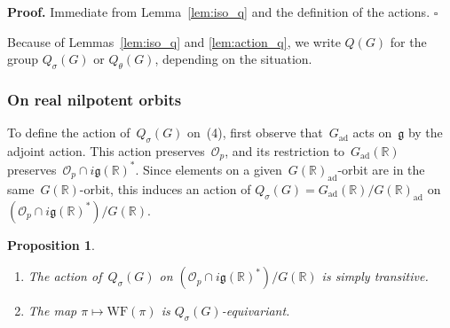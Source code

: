 \documentclass[10pt,leqno]{article}
\newtheorem{proposition}[equation]{Proposition}
\newcommand{\qed}{\hfill $\square$ \medskip}
\newenvironment{proof}[1][Proof]{\noindent\textbf{#1.} }{\qed}
\newcommand{\Gad}{G_\mathrm{ad}}
\renewcommand{\O}{\mathcal O}
\newcommand{\R}{\mathbb R}
\newcommand{\g}{\mathfrak g}
\newcommand{\WF}{\mathrm{WF}}
\newcommand{\Op}{\O_p}
\begin{document}
\begin{proof}
Immediate from Lemma~\ref{lem:iso_q} and the definition of the actions.
\end{proof}


Because of Lemmas~\ref{lem:iso_q} and \ref{lem:action_q}, we write $Q(G)$ for the group $Q_\sigma(G)$ or $Q_\theta(G)$, depending on the situation.



\subsubsection*{On real nilpotent orbits} 

To define the action of~$Q_{\sigma}(G)$ on~(4), first observe that~$\Gad$ acts on~$\g$ by the adjoint action. This action preserves~$\Op$, and its restriction to~$\Gad(\R)$ preserves~$\Op\cap i\g(\R)^*$. Since elements on a given~$G(\R)_{\mathrm{ad}}$-orbit are in the same~$G(\R)$-orbit, this induces an action of $Q_{\sigma}(G)=\Gad(\R)/G(\R)_{\mathrm{ad}}$ on~$(\Op\cap i\g(\R)^*)/G(\R)$.

\begin{proposition}\label{prop:action_on_real_orbits}
\begin{enumerate} 
\item The action of~$Q_{\sigma}(G)$ on $(\Op\cap i\g(\R)^*)/G(\R)$ is simply transitive.
\item The map $\pi \mapsto \WF(\pi)$ is $Q_{\sigma}(G)$-equivariant.
\end{enumerate}
\end{proposition}
\end{document}
